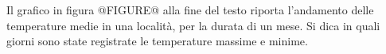 Il grafico in figura @FIGURE@ alla fine del testo 
riporta l'andamento 
delle temperature medie in una località, 
per la durata di un mese. 
Si dica in quali giorni sono state registrate 
le temperature massime e minime.
